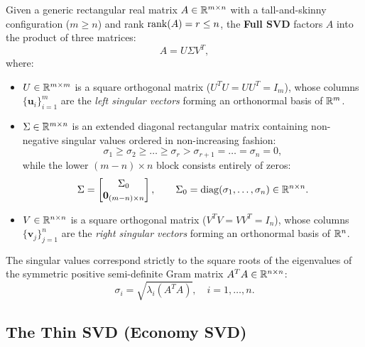 Given a generic rectangular real matrix $A \in \mathbb{R}^{m \times n}$ with a tall-and-skinny configuration ($m \ge n$) and rank $\operatorname{rank}(A) = r \le n$, the \textbf{Full SVD} factors $A$ into the product of three matrices:
\begin{equation}
    A = U \Sigma V^T,
\end{equation}
where:
\begin{itemize}
    \item $U \in \mathbb{R}^{m \times m}$ is a square orthogonal matrix ($U^T U = U U^T = I_m$), whose columns $\{\mathbf{u}_i\}_{i=1}^m$ are the \textit{left singular vectors} forming an orthonormal basis of $\mathbb{R}^m$.
    \item $\Sigma \in \mathbb{R}^{m \times n}$ is an extended diagonal rectangular matrix containing non-negative singular values ordered in non-increasing fashion:
    \begin{equation}
        \sigma_1 \ge \sigma_2 \ge \dots \ge \sigma_r > \sigma_{r+1} = \dots = \sigma_n = 0,
    \end{equation}
    while the lower $(m - n) \times n$ block consists entirely of zeros:
    \begin{equation}
        \Sigma = \begin{bmatrix} \Sigma_0 \\ \mathbf{0}_{(m-n) \times n} \end{bmatrix}, \qquad \Sigma_0 = \operatorname{diag}(\sigma_1, \dots, \sigma_n) \in \mathbb{R}^{n \times n}.
    \end{equation}
    \item $V \in \mathbb{R}^{n \times n}$ is a square orthogonal matrix ($V^T V = V V^T = I_n$), whose columns $\{\mathbf{v}_j\}_{j=1}^n$ are the \textit{right singular vectors} forming an orthonormal basis of $\mathbb{R}^n$.
\end{itemize}

The singular values correspond strictly to the square roots of the eigenvalues of the symmetric positive semi-definite Gram matrix $A^T A \in \mathbb{R}^{n \times n}$:
\begin{equation}
    \sigma_i = \sqrt{\lambda_i(A^T A)}, \quad i = 1, \dots, n.
\end{equation}

\subsection{The Thin SVD (Economy SVD)}

